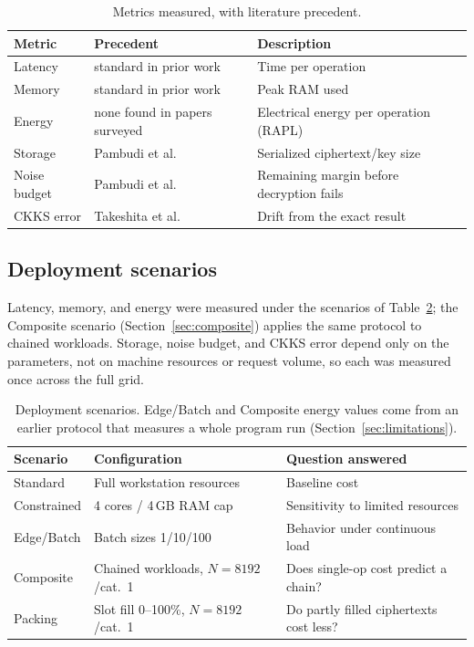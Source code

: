 \begin{table}[h!]
\centering\small
\begin{tabular}{@{}llp{5.3cm}@{}}
\toprule
\textbf{Metric} & \textbf{Precedent} & \textbf{Description} \\
\midrule
Latency & standard in prior work & Time per operation \\
Memory & standard in prior work & Peak RAM used \\
Energy & none found in papers surveyed & Electrical energy per operation (RAPL) \\
Storage & Pambudi et al.~\cite{pambudi2025} & Serialized ciphertext/key size \\
Noise budget & Pambudi et al.~\cite{pambudi2025} & Remaining margin before decryption fails \\
CKKS error & Takeshita et al.~\cite{takeshita2025} & Drift from the exact result \\
\bottomrule
\end{tabular}
\caption{Metrics measured, with literature precedent.}
\label{tab:metrics}
\end{table}

\subsection{Deployment scenarios}

Latency, memory, and energy were measured under the scenarios of Table~\ref{tab:scenarios}; the Composite scenario (Section~\ref{sec:composite}) applies the same protocol to chained workloads. Storage, noise budget, and CKKS error depend only on the parameters, not on machine resources or request volume, so each was measured once across the full grid.

\begin{table}[h!]
\centering\small
\begin{tabular}{@{}lll@{}}
\toprule
\textbf{Scenario} & \textbf{Configuration} & \textbf{Question answered} \\
\midrule
Standard & Full workstation resources & Baseline cost \\
Constrained & 4 cores / 4\,GB RAM cap~\cite{rahman2024} & Sensitivity to limited resources \\
Edge/Batch & Batch sizes 1/10/100~\cite{gouert2023} & Behavior under continuous load \\
Composite & Chained workloads, $N{=}8192$/cat.~1 & Does single-op cost predict a chain? \\
Packing & Slot fill 0--100\%, $N{=}8192$/cat.~1 & Do partly filled ciphertexts cost less? \\
\bottomrule
\end{tabular}
\caption{Deployment scenarios. Edge/Batch and Composite energy values come from an earlier protocol that measures a whole program run (Section~\ref{sec:limitations}).}
\label{tab:scenarios}
\end{table}

